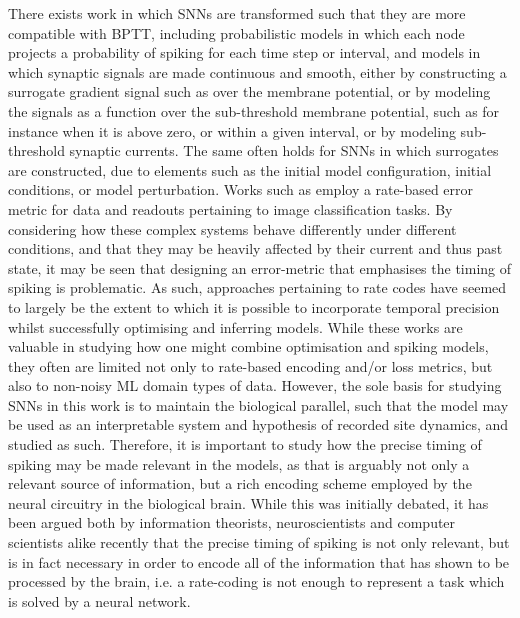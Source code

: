 \documentclass[mphil,deptreport,ianc]{infthesis} %
\begin{document}
There exists work in which SNNs are transformed such that they are more compatible with BPTT, including probabilistic models in which each node projects a probability of spiking for each time step or interval, and models in which synaptic signals are made continuous and smooth, either by constructing a surrogate gradient signal such as over the membrane potential, or by modeling the signals as a function over the sub-threshold membrane potential, such as for instance when it is above zero, or within a given interval, or by modeling sub-threshold synaptic currents.
The same often holds for SNNs in which surrogates are constructed, due to elements such as the initial model configuration, initial conditions, or model perturbation.
Works such as \cite{Jin2018} employ a rate-based error metric for data and readouts pertaining to image classification tasks.
By considering how these complex systems behave differently under different conditions, and that they may be heavily affected by their current and thus past state, it may be seen that designing an error-metric that emphasises the timing of spiking is problematic. As such, approaches pertaining to rate codes have seemed to largely be the extent to which it is possible to incorporate temporal precision whilst successfully optimising and inferring models.
While these works are valuable in studying how one might combine optimisation and spiking models, they often are limited not only to rate-based encoding \cite{Brette2015, Brette2019} and/or loss metrics, but also to non-noisy ML domain types of data.
However, the sole basis for studying SNNs in this work is to maintain the biological parallel, such that the model may be used as an interpretable system and hypothesis of recorded site dynamics, and studied as such.
Therefore, it is important to study how the precise timing of spiking may be made relevant in the models, as that is arguably not only a relevant source of information, but a rich encoding scheme employed by the neural circuitry in the biological brain.
While this was initially debated, it has been argued both by information theorists, neuroscientists and computer scientists alike recently that the precise timing of spiking is not only relevant, but is in fact necessary in order to encode all of the information that has shown to be processed by the brain, i.e. a rate-coding is not enough to represent a task which is solved by a neural network.
\end{document}
